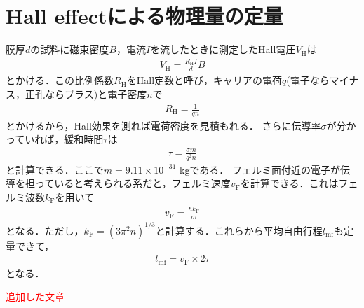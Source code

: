 \documentclass[11pt]{jbook}
\begin{document}
\chapter{Hall effectによる物理量の定量}
膜厚$d$の試料に磁束密度$B$，電流$I$を流したときに測定したHall電圧$V_\mathrm{H}$は
\begin{eqnarray}
	V_\mathrm{H} = \frac{R_\mathrm{H}I}{d}B
\end{eqnarray}
とかける．この比例係数$R_\mathrm{H}$をHall定数と呼び，キャリアの電荷$q$(電子ならマイナス，正孔ならプラス)と電子密度$n$で
\begin{eqnarray}
	R_\mathrm{H} = \frac{1}{qn}
\end{eqnarray}
とかけるから，Hall効果を測れば電荷密度を見積もれる．
さらに伝導率$\sigma$が分かっていれば，緩和時間$\tau$は
\begin{eqnarray}
	\tau = \frac{\sigma m }{q^2 n}
\end{eqnarray}
と計算できる．ここで$m = 9.11\times10^{-31}$ kgである．
フェルミ面付近の電子が伝導を担っていると考えられる系だと，フェルミ速度$v_\mathrm{F}$を計算できる．これはフェルミ波数$k_\mathrm{F}$を用いて
\begin{eqnarray}
	v_\mathrm{F} = \frac{\hbar k_\mathrm{F}}{m}
\end{eqnarray}
となる．ただし，$k_\mathrm{F} = (3\pi^2 n )^{1/3}$と計算する．これらから平均自由行程$l_\mathrm{mf}$も定量できて，
\begin{eqnarray}
	l_\mathrm{mf} = v_\mathrm{F}\times2\tau
\end{eqnarray}
となる．


\textcolor{red}{追加した文章}



\end{document}
